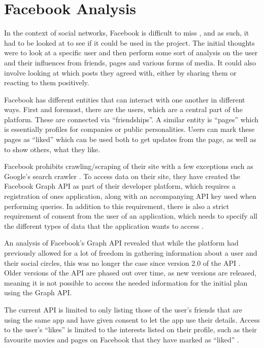 \section{Facebook Analysis}\label{sec:facebook-analysis}
In the context of social networks, Facebook is difficult to miss
\citep{FacebookPopularity}, and as such, it had to be looked at to see if it
could be used in the project.
The initial thoughts were to look at a specific user and then perform some sort of analysis on the user and their
influences from friends, pages and various forms of media.
It could also involve looking at which posts they agreed with, either by sharing
them or reacting to them positively.\nl

Facebook has different entities that can interact with one another in different ways.
First and foremost, there are the users, which are a central part of the
platform. These are connected via ``friendships''.
A similar entity is ``pages'' which is essentially profiles for companies or
public personalities.
Users can mark these pages as ``liked'' which can be used both to get updates
from the page, as well as to show others, what they like.\nl

Facebook prohibits crawling/scraping of their site with a few exceptions such as
Google's search crawler \Source.
To access data on their site, they have created the Facebook Graph API as part
of their developer platform, which requires a registration of ones application, along with an accompanying API key used when performing queries.
In addition to this requirement, there is also a strict requirement of consent
from the user of an application, which needs to specify all the different types
of data that the application wants to access \Source.\nl

An analysis of Facebook's Graph API \Source revealed that while the platform had
previously allowed for a lot of freedom in gathering information about a user
and their social circles, this was no longer the case since version 2.0 of the
API \Source.
Older versions of the API are phased out over time, as new versions are released, meaning it is not possible to access
the needed information for the initial plan using the Graph
API.\nl

The current API is limited to only listing those of the user's friends that are using the same app and have given
consent to let the app use their details.
Access to the user's ``likes'' is limited to the interests listed on their profile, such as their favourite movies and
pages on Facebook that they have marked as ``liked'' \Source.\nl

